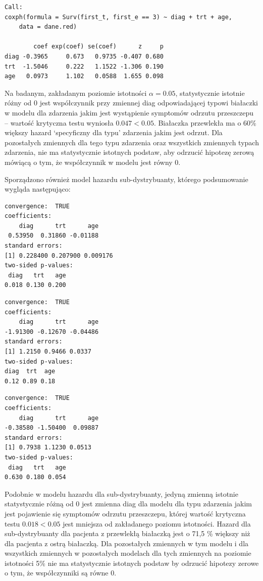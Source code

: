\documentclass[]{article}
\begin{document}
\begin{verbatim}
Call:
coxph(formula = Surv(first_t, first_e == 3) ~ diag + trt + age, 
    data = dane.red)

        coef exp(coef) se(coef)      z     p
diag -0.3965     0.673   0.9735 -0.407 0.680
trt  -1.5046     0.222   1.1522 -1.306 0.190
age   0.0973     1.102   0.0588  1.655 0.098
\end{verbatim}

Na badanym, zakładanym poziomie istotności \(\alpha=0.05\),
statystycznie istotnie różny od 0 jest współczynnik przy zmiennej
\textsf{diag} odpowiadającej typowi białaczki w modelu dla zdarzenia
jakim jest wystąpienie symptomów odrzutu przeszczepu -- wartość
krytyczna testu wyniosła \(0.047<0.05\). Białaczka przewlekła ma o 60\%
większy hazard `specyficzny dla typu' zdarzenia jakim jest odrzut. Dla
pozostałych zmiennych dla tego typu zdarzenia oraz wszystkich zmiennych
 typach zdarzenia, nie ma statystycznie istotnych
podstaw, aby odrzucić hipotezę zerową mówiącą o tym, że współczynnik w
modelu jest równy 0.

Sporządzono również model hazardu sub-dystrybuanty, którego podsumowanie
wygląda następująco:

\begin{verbatim}
convergence:  TRUE 
coefficients:
    diag      trt      age 
 0.53950  0.31860 -0.01188 
standard errors:
[1] 0.228400 0.207900 0.009176
two-sided p-values:
 diag   trt   age 
0.018 0.130 0.200 
\end{verbatim}

\begin{verbatim}
convergence:  TRUE 
coefficients:
    diag      trt      age 
-1.91300 -0.12670 -0.04486 
standard errors:
[1] 1.2150 0.9466 0.0337
two-sided p-values:
diag  trt  age 
0.12 0.89 0.18 
\end{verbatim}

\begin{verbatim}
convergence:  TRUE 
coefficients:
    diag      trt      age 
-0.38580 -1.50400  0.09887 
standard errors:
[1] 0.7938 1.1230 0.0513
two-sided p-values:
 diag   trt   age 
0.630 0.180 0.054 
\end{verbatim}

Podobnie w modelu hazardu dla sub-dystrybuanty, jedyną zmienną istotnie
statystycznie różną od 0 jest zmienna \textsf{diag} dla modelu dla typu
zdarzenia jakim jest pojawienie się symptomów odrzutu przeszczepu,
której wartość krytyczna testu \(0.018<0.05\) jest mniejsza od
zakładanego poziomu istotności. Hazard dla sub-dystrybuanty dla pacjenta
z przewlekłą białaczką jest o 71,5 \% większy niż dla pacjenta z ostrą
białaczką. Dla pozostałych zmiennych w tym modelu i dla wszystkich
zmiennych w pozostałych modelach dla tych zmiennych na poziomie
istotności 5\% nie ma statystycznie istotnych podstaw by odrzucić
hipotezy zerowe o tym, że współczynniki są równe 0.
\end{document}
